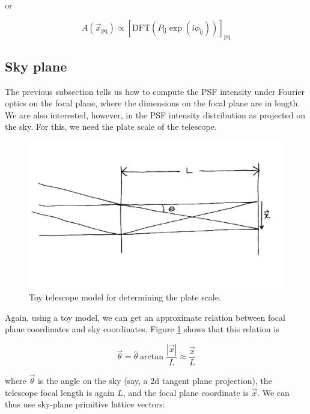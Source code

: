 \documentclass{article}
\begin{document}
or

\begin{equation}
    A(\vec{x}_{\mathrm{pq}}) \propto
        \left[\mathrm{DFT}\left(P_{\mathrm{ij}} \exp\left(i \phi_{\mathrm{ij}} \right) \right)\right]_{\mathrm{pq}}
\end{equation}

\subsection{Sky plane}

The previous subsection tells us how to compute the PSF intensity under Fourier optics on the focal
plane, where the dimensions on the focal plane are in length.  We are also interested, however, in
the PSF intensity distribution as projected on the sky.  For this, we need the plate scale of the
telescope.

\begin{figure}
    \includegraphics{PlateScale.png}
    \caption{Toy telescope model for determining the plate scale.}
    \label{fig:PlateScale}
\end{figure}

Again, using a toy model, we can get an approximate relation between focal plane coordinates and sky
coordinates.  Figure \ref{fig:PlateScale} shows that this relation is

\begin{equation}
    \vec{\theta} = \hat{\theta} \arctan \frac{|\vec{x}|}{L} \approx \frac{\vec{x}}{L}
\end{equation}

where $\vec{\theta}$ is the angle on the sky (say, a 2d tangent plane projection),  the telescope
focal length is again $L$, and the focal plane coordinate is $\vec{x}$.  We can thus use sky-plane
primitive lattice vectors:
\end{document}
